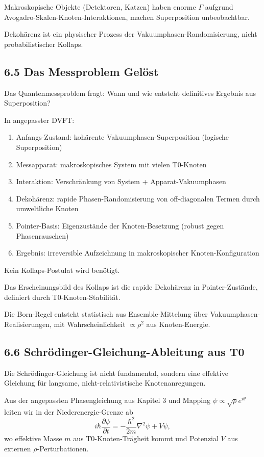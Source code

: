 	Makroskopische Objekte (Detektoren, Katzen) haben enorme $\Gamma$ aufgrund Avogadro-Skalen-Knoten-Interaktionen, machen Superposition unbeobachtbar.
	
	Dekohärenz ist ein physischer Prozess der Vakuumphasen-Randomisierung, nicht probabilistischer Kollaps.
	
	\subsection{6.5 Das Messproblem Gelöst}
	
	Das Quantenmessproblem fragt: Wann und wie entsteht definitives Ergebnis aus Superposition?
	
	In angepasster DVFT:
	\begin{enumerate}
		\item Anfangs-Zustand: kohärente Vakuumphasen-Superposition (logische Superposition)
		\item Messapparat: makroskopisches System mit vielen T0-Knoten
		\item Interaktion: Verschränkung von System + Apparat-Vakuumphasen
		\item Dekohärenz: rapide Phasen-Randomisierung von off-diagonalen Termen durch umweltliche Knoten
		\item Pointer-Basis: Eigenzustände der Knoten-Besetzung (robust gegen Phasenrauschen)
		\item Ergebnis: irreversible Aufzeichnung in makroskopischer Knoten-Konfiguration
	\end{enumerate}
	
	Kein Kollaps-Postulat wird benötigt.
	
	Das Erscheinungsbild des Kollaps ist die rapide Dekohärenz in Pointer-Zustände, definiert durch T0-Knoten-Stabilität.
	
	Die Born-Regel entsteht statistisch aus Ensemble-Mittelung über Vakuumphasen-Realisierungen, mit Wahrscheinlichkeit $\propto \rho^2$ aus Knoten-Energie.
	
	\subsection{6.6 Schrödinger-Gleichung-Ableitung aus T0}
	
	Die Schrödinger-Gleichung ist nicht fundamental, sondern eine effektive Gleichung für langsame, nicht-relativistische Knotenanregungen.
	
	Aus der angepassten Phasengleichung aus Kapitel 3 und Mapping $\psi \propto \sqrt{\rho} e^{i\theta}$ leiten wir in der Niederenergie-Grenze ab
	\[
	i \hbar \frac{\partial \psi}{\partial t} = -\frac{\hbar^2}{2m} \nabla^2 \psi + V \psi,
	\]
	wo effektive Masse $m$ aus T0-Knoten-Trägheit kommt und Potenzial $V$ aus externen $\rho$-Perturbationen.
	
